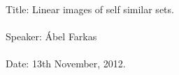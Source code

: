 \documentclass{article}
\numberwithin{equation}{section}
\begin{document}
{\large
Title: Linear images of self similar sets.
\\ \\
Speaker: \'Abel Farkas
\\ \\
Date: 13th November, 2012.}
\\ \\
\begin{abstract}
I will discuss the structure of linear images of self-similar sets. In particular, I will study the behaviour of the dimension and measure and go on to develop a method that helps to handle problems in situations where the open set condition is not satisfied.

\end{abstract}
\end{document}
